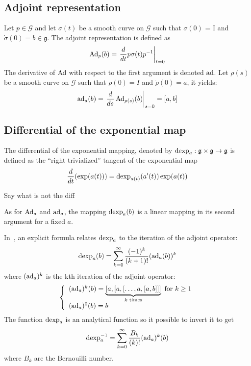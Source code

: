 \subsection{Adjoint representation}
\begin{definition}
Let $p \in \mathcal G$ and let $\sigma (t)$ be a smooth curve on $\mathcal G$ such that $\sigma (0)$ = I and $\dot \sigma(0) = b \in \mathfrak g$. The adjoint representation is defined as
\begin{equation}
\operatorname{Ad}_p(b) =\left. \frac{d}{dt} p\sigma(t)p^{-1}\right|_{t=0}\label{eq:40}
\end{equation}
The derivative of $\operatorname{Ad}$ with respect to the first argument is denoted $\operatorname{ad}$. Let $\rho(s)$ be a smooth curve on $\mathcal G$ such that $\rho(0) = I$  and $\dot \rho(0) = a$, it  yields:
\begin{equation}
  \label{eq:41}
    \operatorname{ad}_a(b) = \left.\frac{d}{ds} \operatorname{Ad}_{\rho(s)}(b)\right|_{s=0}  = [a, b]
\end{equation}
\end{definition}
\subsection{Differential of the exponential map}

\begin{definition}
The differential of the exponential mapping, denoted by $\operatorname{dexp}_a : \mathfrak g \times \mathfrak g \rightarrow \mathfrak g$ is defined as the ``right trivialized'' tangent of the exponential map
\begin{equation}
  \label{eq:42}
  \frac{d}{dt} (\exp(a(t))) = \operatorname{dexp}_{a(t)}(a'(t)) \exp(a(t))
\end{equation}
\end{definition}
\begin{ndrva}
  Say what is not the diff
\end{ndrva}
As for $\operatorname{Ad}_a$ and $\operatorname{ad}_a$, the mapping $\operatorname{dexp}_{a}(b)$ is a linear mapping in its second argument for a fixed $a$. 

In~\cite[Theorem 2.14.13]{Varadarajan_book1984}, an explicit formula relates $\operatorname{dexp}_{a}$ to the iteration of the adjoint operator:
\begin{equation}
  \label{eq:43}
  \operatorname{dexp}_a(b) = \sum_{k=0}^\infty \frac{(-1)^k}{(k+1)!} (\operatorname{ad}_a(b))^k 
\end{equation}
where $(\operatorname{ad}_a)^k$ is the kth iteration of the adjoint operator:
\begin{equation}
  \label{eq:44}
  \left\{\begin{array}[l]{l}
    (\ad_a)^k(b) = \underbrace{[a, [ a, [ \ldots, a, [ a, b]]]}_{k \text{ times}} \text{ for } k \geq 1 \\
    (\ad_a)^0(b)  = b
  \end{array}\right.
\end{equation}
The function $\operatorname{dexp}_{a}$ is an analytical function so it possible to invert it to get
\begin{equation}
  \label{eq:45}
  \operatorname{dexp}^{-1}_{a} = \sum_{k=0}^\infty \frac{B_k}{(k)!} (\operatorname{ad}_a)^k(b) 
\end{equation}
where $B_k$ are the Bernouilli number.

